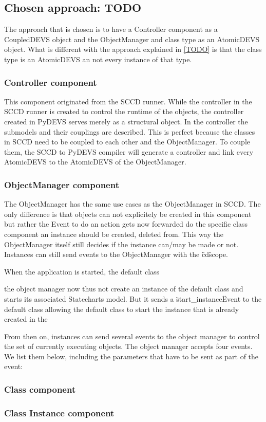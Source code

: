 \subsection{Chosen approach: TODO}
The approach that is chosen is to have a Controller component as a CoupledDEVS object and the ObjectManager and class type as an AtomicDEVS object. What is different with the approach explained in \ref{TODO} is that 
the class type is an AtomicDEVS an not every instance of that type. 

\subsubsection{Controller component}
This component originated from the SCCD runner. While the controller in the SCCD runner is created to control the runtime of the objects, the controller created in PyDEVS serves merely as a structural object. In the 
controller the submodels and their couplings are described. This is perfect because the classes in SCCD need to be coupled to each other and the ObjectManager. To couple them, the SCCD to PyDEVS compiler will generate 
a controller and link every AtomicDEVS to the AtomicDEVS of the ObjectManager.

\subsubsection{ObjectManager component}
The ObjectManager has the same use cases as the ObjectManager in SCCD. The only difference is that objects can not explicitely be created in this component but rather the Event to do an action gets now forwarded do the 
specific class component an instance should be created, deleted from. This way the ObjectManager itself still decides if the instance can/may be made or not. Instances can still send events to the ObjectManager with the 
\"cd\" scope. 


When the application is started, the default class

the object manager now thus not create an instance of the default class and starts its associated Statecharts model. But it sends a \"start\_instance\" Event to the default class allowing 
the default class to start the instance that is already created in the 

From then on, instances can send several events to the object manager to control the set of currently executing objects. The object manager accepts four events. We list them below, including the parameters that have to be sent as part of the event:

\subsubsection{Class component}

\subsubsection{Class Instance component}